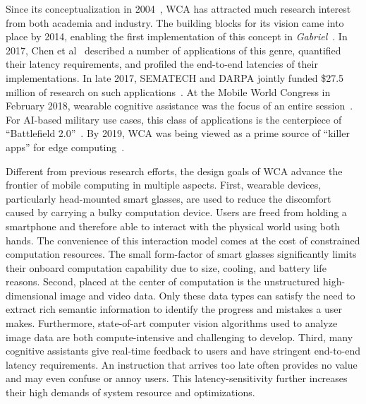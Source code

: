 Since its conceptualization in 2004~\cite{Satya2004}, WCA has attracted much
research interest from both academia and industry. The building blocks for its
vision came into place by 2014, enabling the first implementation of this
concept in {\em Gabriel}~\cite{ha2014towards}. In 2017, Chen et
al~\cite{chen2017empirical} described a number of applications of this genre,
quantified their latency requirements, and profiled the end-to-end latencies of
their implementations. In late 2017, SEMATECH and DARPA jointly funded \$27.5
million of research on such applications~\cite{Oakley2018, Stokes2018}.  At the
Mobile World Congress in February 2018, wearable cognitive assistance was the
focus of an entire session~\cite{Ray2018}.  For AI-based military use cases,
this class of applications is the centerpiece of ``Battlefield
2.0''~\cite{Doffman2018}. By 2019, WCA was being viewed as a prime source of
``killer apps'' for edge computing~\cite{Satya2019b,Satya2019c}.


Different from previous research efforts, the design goals of WCA advance the
frontier of mobile computing in multiple aspects. First, wearable devices,
particularly head-mounted smart glasses, are used to reduce the discomfort
caused by carrying a bulky computation device. Users are freed from holding a
smartphone and therefore able to interact with the physical world using both
hands. The convenience of this interaction model comes at the cost of
constrained computation resources. The small form-factor of smart glasses
significantly limits their onboard computation capability due to size, cooling,
and battery life reasons. Second, placed at the center of computation is the
unstructured high-dimensional image and video data. Only these data types can
satisfy the need to extract rich semantic information to identify the progress
and mistakes a user makes. Furthermore, state-of-art computer vision algorithms
used to analyze image data are both compute-intensive and challenging to
develop. Third, many cognitive assistants give real-time feedback to users and
have stringent end-to-end latency requirements. An instruction that arrives too
late often provides no value and may even confuse or annoy users. This
latency-sensitivity further increases their high demands of system resource and
optimizations.

